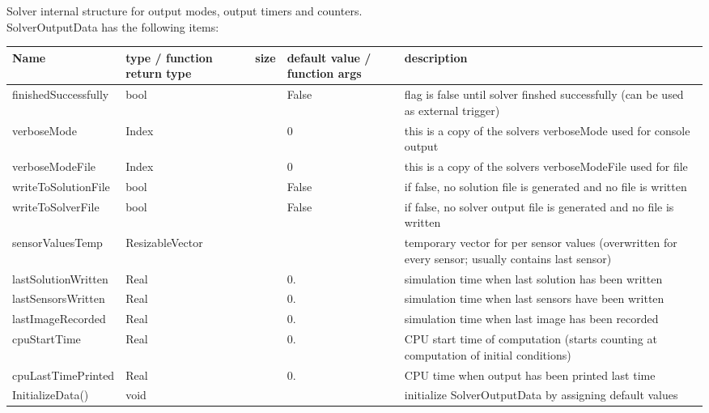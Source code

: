  \label{sec:SolverOutputData}
Solver internal structure for output modes, output timers and counters.\\ 
%
SolverOutputData has the following items:
\begin{center}
  \footnotesize
  \begin{longtable}{| p{4.2cm} | p{2.5cm} | p{0.3cm} | p{3.0cm} | p{6cm} |}
    \hline
    \bf Name & \bf type / function return type & \bf size & \bf default value / function args & \bf description \\ \hline
    finishedSuccessfully &     bool &      &     False &     flag is false until solver finshed successfully (can be used as external trigger)\\ \hline
    verboseMode &     Index &      &     0 &     this is a copy of the solvers verboseMode used for console output\\ \hline
    verboseModeFile &     Index &      &     0 &     this is a copy of the solvers verboseModeFile used for file\\ \hline
    writeToSolutionFile &     bool &      &     False &     if false, no solution file is generated and no file is written\\ \hline
    writeToSolverFile &     bool &      &     False &     if false, no solver output file is generated and no file is written\\ \hline
    sensorValuesTemp &     ResizableVector &      &      &     temporary vector for per sensor values (overwritten for every sensor; usually contains last sensor)\\ \hline
    lastSolutionWritten &     Real &      &     0. &     simulation time when last solution has been written\\ \hline
    lastSensorsWritten &     Real &      &     0. &     simulation time when last sensors have been written\\ \hline
    lastImageRecorded &     Real &      &     0. &     simulation time when last image has been recorded\\ \hline
    cpuStartTime &     Real &      &     0. &     CPU start time of computation (starts counting at computation of initial conditions)\\ \hline
    cpuLastTimePrinted &     Real &      &     0. &     CPU time when output has been printed last time\\ \hline
    InitializeData() &     void &      &      &     initialize SolverOutputData by assigning default values\\ \hline
	  \end{longtable}
	\end{center}

